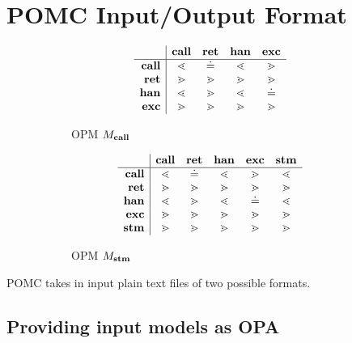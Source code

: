 \documentclass[9pt,a4paper]{article}
\begin{document}
\section{POMC Input/Output Format}
\label{sec:format}

\begin{figure}
\begin{subfigure}{.5\linewidth}
\[
\begin{array}{r | c c c c}
         & \mathbf{call}   & \mathbf{ret}   & \mathbf{han} & \mathbf{exc} \\
\hline
\mathbf{call}   & \lessdot & \doteq  & \lessdot & \gtrdot \\
\mathbf{ret}    & \gtrdot  & \gtrdot & \gtrdot  & \gtrdot \\
\mathbf{han} & \lessdot & \gtrdot & \lessdot & \doteq \\
\mathbf{exc}  & \gtrdot  & \gtrdot & \gtrdot  & \gtrdot \\
\end{array}
\]
\caption{OPM $M_{\mathbf{call}}$}
\label{fig:mcall}
\end{subfigure}
\begin{subfigure}{.5\linewidth}
\[
\begin{array}{r | c c c c c}
         & \mathbf{call}   & \mathbf{ret}   & \mathbf{han} & \mathbf{exc} & \mathbf{stm} \\
\hline
\mathbf{call}   & \lessdot & \doteq  & \lessdot & \gtrdot & \lessdot \\
\mathbf{ret}    & \gtrdot  & \gtrdot & \gtrdot  & \gtrdot & \gtrdot \\
\mathbf{han} & \lessdot & \gtrdot & \lessdot & \doteq  & \lessdot \\
\mathbf{exc}  & \gtrdot  & \gtrdot & \gtrdot  & \gtrdot & \gtrdot \\
\mathbf{stm}   & \gtrdot  & \gtrdot & \gtrdot  & \gtrdot & \gtrdot \\
\end{array}
\]
\caption{OPM $M_{\mathbf{stm}}$}
\label{fig:mstm}
\end{subfigure}
\caption{}
\label{fig:opms}
\end{figure}

POMC takes in input plain text files of two possible formats.

\subsection{Providing input models as OPA}
\end{document}
